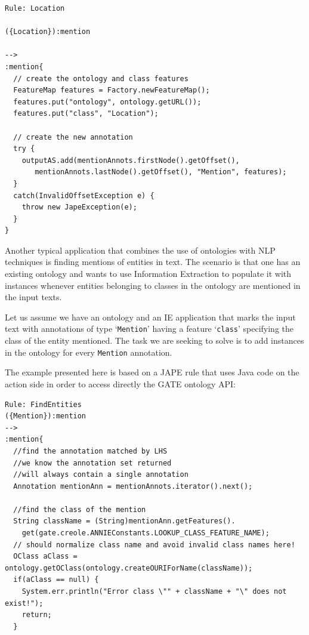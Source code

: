 {\begin{small}\begin{verbatim}
Rule: Location

({Location}):mention

-->
:mention{
  // create the ontology and class features
  FeatureMap features = Factory.newFeatureMap();
  features.put("ontology", ontology.getURL());
  features.put("class", "Location");

  // create the new annotation
  try {
    outputAS.add(mentionAnnots.firstNode().getOffset(),
       mentionAnnots.lastNode().getOffset(), "Mention", features);
  }
  catch(InvalidOffsetException e) {
    throw new JapeException(e);
  }
}
\end{verbatim}\end{small}


Another typical application that combines the use of ontologies with NLP techniques 
is finding mentions of entities in text. The scenario is that one has an 
existing ontology and wants to use Information Extraction to populate it with 
instances whenever entities belonging to classes in the ontology are mentioned 
in the input texts. 

Let us assume we have an ontology and an IE application that marks the input 
text with annotations of type `{\tt Mention}' having a feature `{\tt class}' 
specifying the class of the entity mentioned. The task we are seeking to solve 
is to add instances in the ontology for every {\tt Mention} annotation.

The example presented here is based on a JAPE rule that uses Java code on the 
action side in order to access directly the GATE ontology API:

\begin{lstlisting}
Rule: FindEntities
({Mention}):mention
-->
:mention{
  //find the annotation matched by LHS
  //we know the annotation set returned
  //will always contain a single annotation
  Annotation mentionAnn = mentionAnnots.iterator().next();
  
  //find the class of the mention
  String className = (String)mentionAnn.getFeatures().
    get(gate.creole.ANNIEConstants.LOOKUP_CLASS_FEATURE_NAME);
  // should normalize class name and avoid invalid class names here!
  OClass aClass = ontology.getOClass(ontology.createOURIForName(className));
  if(aClass == null) { 
    System.err.println("Error class \"" + className + "\" does not exist!");
    return; 
  } 
    

\end{lstlisting}}

